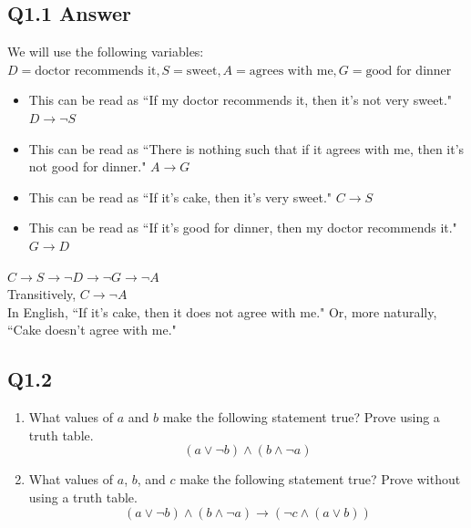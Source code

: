 \documentclass{article}
\begin{document}
\subsection*{Q1.1 Answer}
We will use the following variables: $D=\text{doctor recommends it},S=\text{sweet},A=\text{agrees with me},G=\text{good for dinner}$
\begin{itemize}
    \item This can be read as ``If my doctor recommends it, then it's not very sweet." $D\rightarrow \neg S$
    \item This can be read as ``There is nothing such that if it agrees with me, then it's not good for dinner." $A\rightarrow G$
    \item This can be read as ``If it's cake, then it's very sweet." $C\rightarrow S$
    \item This can be read as ``If it's good for dinner, then my doctor recommends it." $G\rightarrow D$
\end{itemize}
$C\rightarrow S\rightarrow \neg D\rightarrow\neg G\rightarrow \neg A$
\\ Transitively, $C\rightarrow\neg A$
\\ In English, ``If it's cake, then it does not agree with me." Or, more naturally, ``Cake doesn't agree with me."
\newpage
{}
\subsection*{Q1.2}
\begin{enumerate}[label=\alph*.]
    \item What values of $a$ and $b$ make the following statement true? Prove using a truth table.
    $$(a \lor \neg b) \land (b \land \neg a)$$
    \item What values of $a$, $b$, and $c$ make the following statement true? Prove without using a truth table.
    $$(a \lor \neg b) \land (b \land \neg a)\rightarrow (\neg c\land(a \lor b))$$
\end{enumerate}
\newpage
\end{document}
